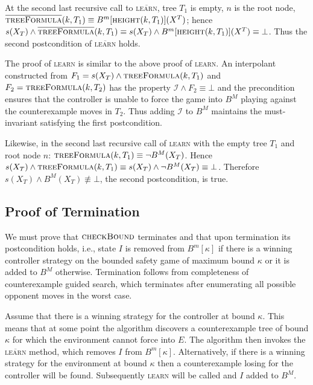 \documentclass{llncs}
\newcommand{\II}{\mathcal{I}}
\newcommand{\textoverline}[1]{$\overline{\mbox{#1}}$}
\begin{document}
At the second last recursive call to \textsc{\textoverline{learn}}, tree $T_1$
is empty, $n$ is the root node, $\textsc{\textoverline{treeFormula}}(k, T_1)
\equiv B^m[\textsc{height}(k, T_1)](X^T)$; hence $s(X_T) \land
\textsc{\textoverline{treeFormula}}(k, T_1) \equiv s(X_T) \land
B^m[\textsc{height}(k, T_1)](X^T) \equiv \bot$.  Thus the second postcondition of
\textsc{\textoverline{learn}} holds.

The proof of \textsc{learn} is similar to the above proof of \textsc{learn}. An
interpolant constructed from $F_1=s(X_T) \land \textsc{treeFormula}(k, T_1)$
and $F_2 = \textsc{treeFormula}(k, T_2)$ has the property $\II \land F_2 \equiv
\bot$ and the precondition ensures that the controller is unable to force the
game into $B^M$ playing against the counterexample moves in $T_2$. Thus adding
$\II$ to $B^M$ maintains the must-invariant satisfying the first postcondition.

Likewise, in the second last recursive call of \textsc{learn} with the empty
tree $T_1$ and root node $n$: $\textsc{treeFormula}(k, T_1) \equiv \lnot
B^M(X_T)$.  Hence $s(X_T) \land \textsc{treeFormula}(k, T_1) \equiv
s(X_T) \land \lnot B^M(X_T) \equiv \bot$. Therefore $s(X_T) \land
B^M(X_T) \not\equiv \bot$, the second postcondition, is true.

\subsection{Proof of Termination}

We must prove that $\textsc{checkBound}$ terminates and that upon termination
its postcondition holds, i.e., state $I$ is removed from $B^m[\kappa]$ if there
is a winning controller strategy on the bounded safety game of maximum bound
$\kappa$ or it is added to $B^M$ otherwise. Termination follows from
completeness of counterexample guided search, which terminates after
enumerating all possible opponent moves in the worst case.

Assume that there is a winning strategy for the controller at bound $\kappa$.
This means that at some point the algorithm discovers a counterexample tree of
bound $\kappa$ for which the environment cannot force into $E$. The algorithm
then invokes the \textsc{\textoverline{learn}} method, which removes $I$ from
$B^m[\kappa]$.  Alternatively, if there is a winning strategy for the
environment at bound $\kappa$ then a counterexample losing for the controller
will be found.  Subsequently \textsc{learn} will be called and $I$ added to
$B^M$.
\end{document}
